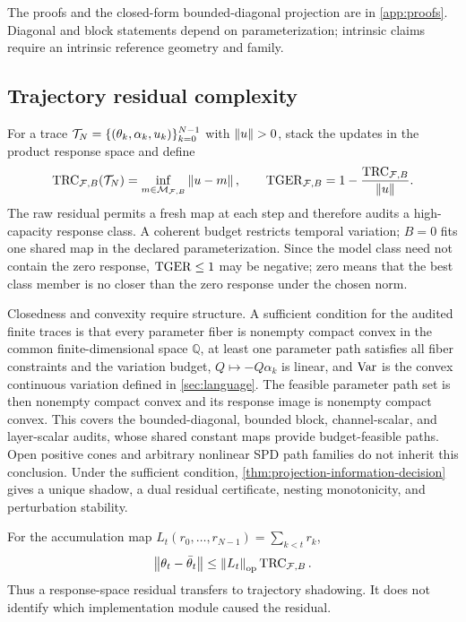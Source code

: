 The proofs and the closed-form bounded-diagonal projection are in \cref{app:proofs}.  Diagonal and block statements depend on parameterization; intrinsic claims require an intrinsic reference geometry and family.

\subsection{Trajectory residual complexity}

For a trace $\mathcal T_N=\{(\theta_k,\alpha_k,u_k)\}_{k=0}^{N-1}$ with $\left\lVert u\right\rVert>0$, stack the updates in the product response space and define
\begin{equation}
\operatorname{TRC}_{\mathcal F,B}(\mathcal T_N)
=\inf_{m\in\mathcal M_{\mathcal F,B}}\left\lVert u-m\right\rVert,
\qquad
\operatorname{TGER}_{\mathcal F,B}=1-
\frac{\operatorname{TRC}_{\mathcal F,B}}{\left\lVert u\right\rVert}.
\label{eq:trajectory-residual-complexity}
\end{equation}
The raw residual permits a fresh map at each step and therefore audits a high-capacity response class.  A coherent budget restricts temporal variation; $B=0$ fits one shared map in the declared parameterization.  Since the model class need not contain the zero response, $\operatorname{TGER}\le1$ may be negative; zero means that the best class member is no closer than the zero response under the chosen norm.

Closedness and convexity require structure.  A sufficient condition for the audited finite traces is that every parameter fiber is nonempty compact convex in the common finite-dimensional space $\mathbb Q$, at least one parameter path satisfies all fiber constraints and the variation budget, $Q\mapsto-Q\alpha_k$ is linear, and $\operatorname{Var}$ is the convex continuous variation defined in \cref{sec:language}.  The feasible parameter path set is then nonempty compact convex and its response image is nonempty compact convex.  This covers the bounded-diagonal, bounded block, channel-scalar, and layer-scalar audits, whose shared constant maps provide budget-feasible paths.  Open positive cones and arbitrary nonlinear SPD path families do not inherit this conclusion.  Under the sufficient condition, \cref{thm:projection-information-decision} gives a unique shadow, a dual residual certificate, nesting monotonicity, and perturbation stability.

For the accumulation map $L_t(r_0,\ldots,r_{N-1})=\sum_{k<t}r_k$,
\[
\left\lVert \theta_t-\bar\theta_t\right\rVert
\le\left\lVert L_t\right\rVert_{\mathrm{op}}\operatorname{TRC}_{\mathcal F,B}.
\]
Thus a response-space residual transfers to trajectory shadowing.  It does not identify which implementation module caused the residual.


